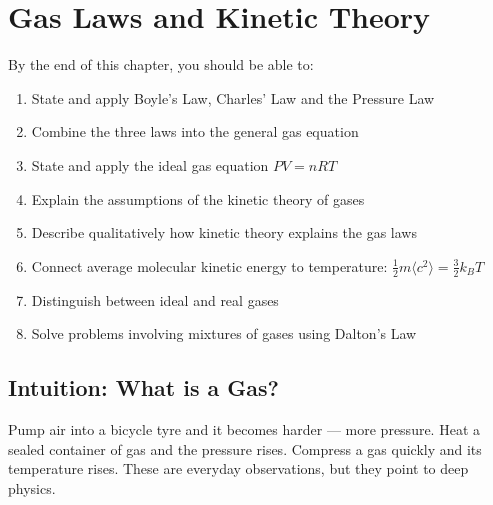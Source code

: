 %

\chapter{Gas Laws and Kinetic Theory}
\label{ch:gas_laws}
\minitoc
\newpage


\begin{objectivebox}
By the end of this chapter, you should be able to:
\begin{enumerate}[noitemsep]
  \item State and apply Boyle's Law, Charles' Law
  and the Pressure Law
  \item Combine the three laws into the general gas
  equation
  \item State and apply the ideal gas equation
  $PV = nRT$
  \item Explain the assumptions of the kinetic theory
  of gases
  \item Describe qualitatively how kinetic theory
  explains the gas laws
  \item Connect average molecular kinetic energy to
  temperature: $\frac{1}{2}m\langle c^2 \rangle
  = \frac{3}{2}k_BT$
  \item Distinguish between ideal and real gases
  \item Solve problems involving mixtures of gases
  using Dalton's Law
\end{enumerate}
\end{objectivebox}

\section{Intuition: What is a Gas?}

Pump air into a bicycle tyre and it becomes harder ---
more pressure. Heat a sealed container of gas and the
pressure rises. Compress a gas quickly and its temperature rises. These are everyday observations, but they point
to deep physics.

